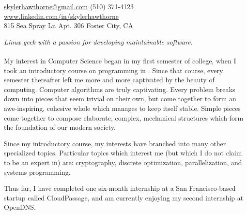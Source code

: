 \documentclass[10pt]{article}
\begin{document}
\sloppy  %



\nobreakvspace{0.3em}  %

\noindent\href{mailto:skyler.hawthorne.at.gmail.dot.com}{skylerhawthorne\mbox{}@\mbox{}gmail.com}\sbull
(510) 371-4123\sbull
\href{http://www.linkedin.com/in/skylerhawthorne}{www.linkedin.com/in/skylerhawthorne}
\\
815 Sea Spray Ln\sbull
Apt. 306\sbull
Foster City, CA

\spacedhrule{0.9em}{-0.4em}  %


\vspace{-1.3em}  %
\begin{multicols}{2}  %
\noindent \emph{Linux geek with a passion for developing maintainable software.}
\\
\\
My interest in Computer Science began in my first semester of college, when I took an introductory course on programming in \CPP. Since that course, every semester thereafter left me more and more captivated by the beauty of computing. Computer algorithms are truly captivating. Every problem breaks down into pieces that seem trivial on their own, but come together to form an awe-inspiring, cohesive whole which manages to keep itself stable. Simple pieces come together to compose elaborate, complex, mechanical structures which form the foundation of our modern society.

Since my introductory course, my interests have branched into many other specialized topics. Particular topics which interest me (but which I do not claim to be an expert in) are: cryptography, discrete optimization, parallelization, and systems programming.

Thus far, I have completed one six-month internship at a San Francisco-based startup called CloudPassage, and am currently enjoying my second internship at OpenDNS.
\end{multicols}
\end{document}
